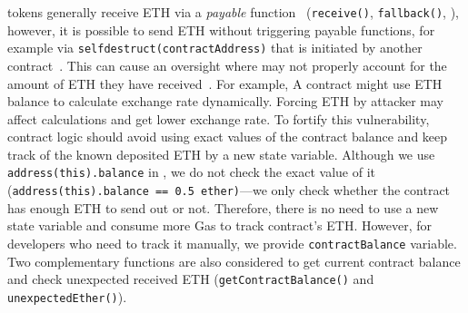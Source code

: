 \erc tokens generally receive ETH via a \textit{payable} function~\cite{SolidityDocPayable} (\ie \texttt{receive()}, \texttt{fallback()}, \etc), however, it is possible to send ETH without triggering payable functions, for example via \texttt{selfdestruct(contractAddress)} that is initiated by another contract~\cite{SolidityByExampleSelfDestruct}. This can cause an oversight where \erc may not properly account for the amount of ETH they have received~\cite{UnexpectedEth}. { \blue For example, A contract might use ETH balance to calculate exchange rate dynamically. Forcing ETH by attacker may affect calculations and get lower exchange rate.} To fortify this vulnerability, contract logic should avoid using exact values of the contract balance and keep track of the known deposited ETH by a new state variable. Although we use \texttt{address(this).balance} in \sys, we do not check the exact value of it (\ie \texttt{address(this).balance == 0.5 ether)}---we only check whether the contract has enough ETH to send out or not. Therefore, there is no need to use a new state variable and consume more Gas to track contract's ETH. However, for developers who need to track it manually, we provide \texttt{contractBalance} variable. Two complementary functions are also considered to get current contract balance and check unexpected received ETH (\ie \texttt{getContractBalance()} and \texttt{unexpectedEther()}).
%
%
%
